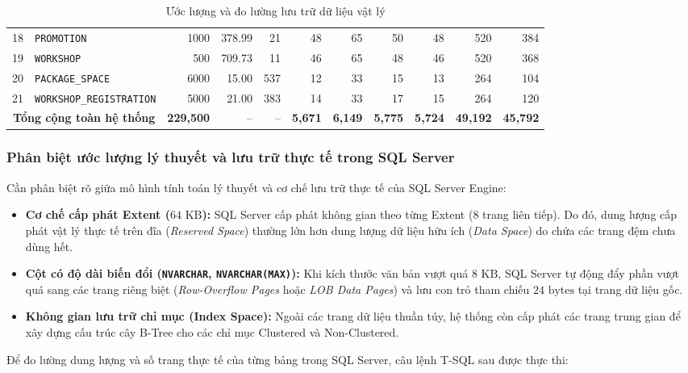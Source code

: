 \begin{table}[htbp]
{\begin{tabular}{|c|l|r|r|r|r|r|r|r|r|r|}
18 & \texttt{PROMOTION} & 1000 & 378.99 & 21 & 48 & 65 & 50 & 48 & 520 & 384 \\
19 & \texttt{WORKSHOP} & 500 & 709.73 & 11 & 46 & 65 & 48 & 46 & 520 & 368 \\
20 & \texttt{PACKAGE\_SPACE} & 6000 & 15.00 & 537 & 12 & 33 & 15 & 13 & 264 & 104 \\
21 & \texttt{WORKSHOP\_REGISTRATION} & 5000 & 21.00 & 383 & 14 & 33 & 17 & 15 & 264 & 120 \\
\hline
\multicolumn{2}{|c|}{\textbf{Tổng cộng toàn hệ thống}} & \textbf{229{,}500} & -- & -- & \textbf{5{,}671} & \textbf{6{,}149} & \textbf{5{,}775} & \textbf{5{,}724} & \textbf{49{,}192} & \textbf{45{,}792} \\
\hline
\end{tabular}
}%
\caption{Ước lượng và đo lường lưu trữ dữ liệu vật lý}
\label{tab:storage_estimation}
\end{table}

\subsubsection{Phân biệt ước lượng lý thuyết và lưu trữ thực tế trong SQL Server}

Cần phân biệt rõ giữa mô hình tính toán lý thuyết và cơ chế lưu trữ thực tế của SQL Server Engine:
\begin{itemize}
    \item \textbf{Cơ chế cấp phát Extent ($64\text{ KB}$):} SQL Server cấp phát không gian theo từng Extent (8 trang liên tiếp). Do đó, dung lượng cấp phát vật lý thực tế trên đĩa (\textit{Reserved Space}) thường lớn hơn dung lượng dữ liệu hữu ích (\textit{Data Space}) do chứa các trang đệm chưa dùng hết.
    \item \textbf{Cột có độ dài biến đổi (\texttt{NVARCHAR}, \texttt{NVARCHAR(MAX)}):} Khi kích thước văn bản vượt quá $8\text{ KB}$, SQL Server tự động đẩy phần vượt quá sang các trang riêng biệt (\textit{Row-Overflow Pages} hoặc \textit{LOB Data Pages}) và lưu con trỏ tham chiếu $24\text{ bytes}$ tại trang dữ liệu gốc.
    \item \textbf{Không gian lưu trữ chỉ mục (Index Space):} Ngoài các trang dữ liệu thuần túy, hệ thống còn cấp phát các trang trung gian để xây dựng cấu trúc cây B-Tree cho các chỉ mục Clustered và Non-Clustered.
\end{itemize}

Để đo lường dung lượng và số trang thực tế của từng bảng trong SQL Server, câu lệnh T-SQL sau được thực thi:

